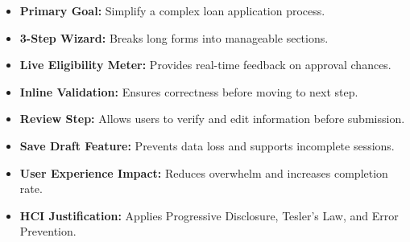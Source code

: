 \documentclass[11pt,a4paper]{article}
\begin{document}
\begin{itemize}[leftmargin=1.5em,itemsep=4pt]

\item \textbf{Primary Goal:}
Simplify a complex loan application process.

\item \textbf{3-Step Wizard:}
Breaks long forms into manageable sections.

\item \textbf{Live Eligibility Meter:}
Provides real-time feedback on approval chances.

\item \textbf{Inline Validation:}
Ensures correctness before moving to next step.

\item \textbf{Review Step:}
Allows users to verify and edit information before submission.

\item \textbf{Save Draft Feature:}
Prevents data loss and supports incomplete sessions.

\item \textbf{User Experience Impact:}
Reduces overwhelm and increases completion rate.

\item \textbf{HCI Justification:}
Applies Progressive Disclosure, Tesler’s Law, and Error Prevention.

\end{itemize}
\end{document}
